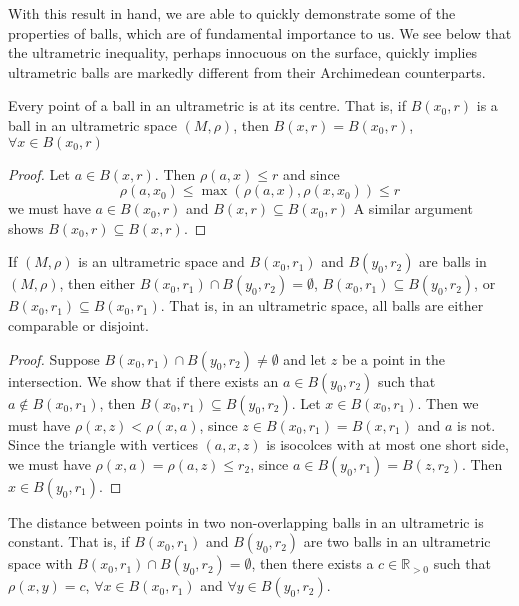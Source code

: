 With this result in hand, we are able to quickly demonstrate some of the properties of balls, which are of fundamental importance to us. We see below that the ultrametric inequality, perhaps innocuous on the surface, quickly implies ultrametric balls are markedly different from their Archimedean counterparts.\\

\begin{proposition}
 Every point of a ball in an ultrametric is at its centre. That is, if $B(x_0, r)$ is a ball in an ultrametric space $(M,\rho)$, then $B(x, r)=B(x_0, r)$,  $\forall x \in B(x_0, r)$
\end{proposition}

\begin{proof}
Let $a \in B(x, r)$. Then $\rho(a,x) \leq r$ and since \[\rho(a,x_0) \leq \max(\rho(a,x), \rho(x,x_0)) \leq r\] we must have $a \in B(x_0, r)$ and  $B(x, r) \subseteq B(x_0, r)$ A similar argument shows $B(x_0, r) \subseteq B(x, r)$.
\end{proof}

\begin{proposition}
	If $(M, \rho)$ is an ultrametric space and $B(x_0, r_1)$ and $B(y_0, r_2)$ are balls in $(M, \rho)$, then either $B(x_0, r_1) \cap B(y_0, r_2) = \emptyset$, $B(x_0, r_1) \subseteq B(y_0, r_2)$, or $B(x_0, r_1) \subseteq B(x_0, r_1)$. That is, in an ultrametric space, all balls are either comparable or disjoint.
\end{proposition}

\begin{proof}
Suppose $B(x_0, r_1) \cap B(y_0, r_2) \neq \emptyset$ and let $z$ be a point in the intersection. We show that if there exists an $a \in B(y_0, r_2)$ such that $a \notin B(x_0,r_1)$, then $B(x_0, r_1) \subseteq B(y_0, r_2)$. Let $x \in B(x_0, r_1)$. Then we must have $\rho(x,z) < \rho(x,a)$, since $z \in B(x_0, r_1) = B(x,r_1)$ and $a$ is not. Since the triangle with vertices $(a,x,z)$ is isocolces with at most one short side, we must have $\rho(x,a) = \rho(a,z) \leq r_2$, since $a \in B(y_0, r_1) = B(z,r_2)$. Then $x \in B(y_0, r_1)$. 
\end{proof}

\begin{proposition}
 The distance between points in  two non-overlapping balls in an ultrametric is constant. That is, if $B(x_0, r_1)$ and $B(y_0, r_2)$ are two balls in an ultrametric space with $B(x_0, r_1) \cap B(y_0, r_2) = \emptyset$, then there exists a $c \in \mathbb{R}_{> 0}$ such that  $\rho(x,y)=c$, $\forall x \in B(x_0, r_1)$ and $\forall y \in B(y_0, r_2)$.
\end{proposition}

